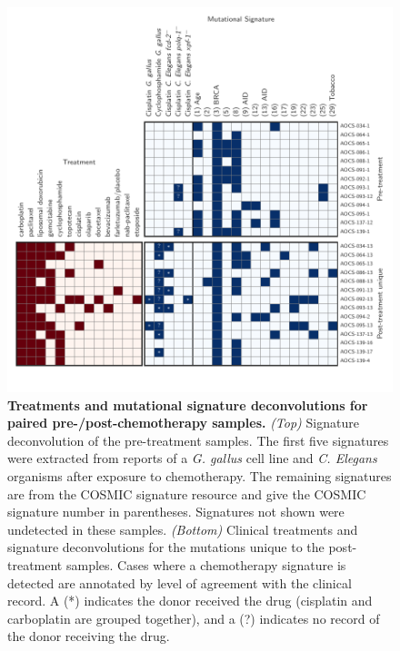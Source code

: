 \begin{figure}[htbp]
\centering
\includegraphics[scale=1.0]{figures/signatures.pdf}
\caption{\textbf{Treatments and mutational signature deconvolutions for paired pre-/post-chemotherapy samples.} \textit{(Top)} Signature deconvolution of the pre-treatment samples. The first five signatures were extracted from reports of a \textit{G. gallus}\cite{Szikriszt_2016} cell line and \textit{C. Elegans}\cite{Meier_2014} organisms after exposure to chemotherapy. The remaining signatures are from the COSMIC signature resource\cite{364242} and give the COSMIC signature number in parentheses. Signatures not shown were undetected in these samples. \textit{(Bottom)} Clinical treatments and signature deconvolutions for the mutations unique to the post-treatment samples. Cases where a chemotherapy signature is detected are annotated by level of agreement with the clinical record. A (*) indicates the donor received the drug (cisplatin and carboplatin are grouped together), and a (?) indicates no record of the donor receiving the drug.}
\label{fig:signatures}
\end{figure}

